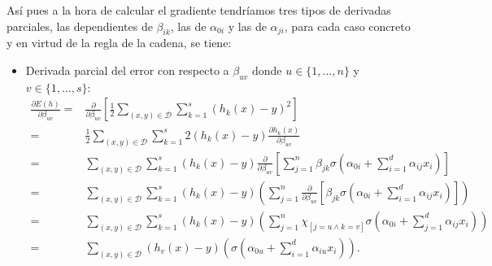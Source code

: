 Así pues a la hora de calcular el gradiente tendríamos tres tipos de derivadas parciales, las dependientes de $\beta_{i  k}$, 
las de $\alpha_{0 i}$ y las de $\alpha_{j i}$, para cada caso concreto y en virtud de la regla de la cadena, se tiene: 
\begin{itemize}
    \item Derivada parcial del error con respecto a $\beta_{u v}$ donde $u \in \{1, \ldots, n\}$ y $v \in \{1, \ldots, s\}$:
    \begin{align} \label{eq:parcial_beta}
        \frac{\partial E(h)}{\partial \beta_{u v}} 
        = &
        \frac{\partial}{\partial \beta_{u v}}
        \left[
            \frac{1}{2}
            \sum_{(x,y) \in \mathcal{D}}
            \sum_{k = 1}^s 
            \left(h_k(x) - y\right)^2
        \right]
        \\ %
        = &
        \frac{1}{2}
        \sum_{(x,y) \in \mathcal{D}}
        \sum_{k = 1}^s 
        2 \left(h_k(x) - y\right)
        \frac{\partial h_k(x)}{\partial \beta_{u v}} 
        \\ 
        = & %
        \sum_{(x,y) \in \mathcal{D}}
        \sum_{k = 1}^s 
        \left(h_k(x) - y\right)
        \frac{\partial}{\partial \beta_{u v}} 
        \left[
            \sum_{j = 1}^n 
                \beta_{j k}
                \sigma
                \left(  
                    \alpha_{0 i} +
                    \sum_{i=1}^d \alpha_{i j}x_i
                \right)
        \right] 
        \\ 
        = & %
        \sum_{(x,y) \in \mathcal{D}}
        \sum_{k = 1}^s 
        \left(h_k(x) - y\right)
        \left(
            \sum_{j = 1}^n 
            \frac{\partial}{\partial \beta_{u v}} 
            \left[
                \beta_{j k}
                \sigma
                \left(  
                    \alpha_{0 i} +
                    \sum_{i=1}^d \alpha_{i j}x_i
                \right)
            \right]
        \right) 
        \\ 
        = & %
        \sum_{(x,y) \in \mathcal{D}}
        \sum_{k = 1}^s 
        \left(h_k(x) - y\right)
        \left(
            \sum_{j = 1}^n 
                \chi_{[j = u \wedge k = v]}
                \sigma
                \left(  
                    \alpha_{0 i} +
                    \sum_{j=1}^d \alpha_{i j}x_i
                \right)
        \right)
        \\ 
        = & %
        \sum_{(x,y) \in \mathcal{D}}
        \left(h_v(x) - y\right)
        \left(
            \sigma
            \left(  
                \alpha_{0 u} +
                \sum_{i=1}^d \alpha_{i u}x_i
            \right)
        \right).
    \end{align}


\end{itemize}
